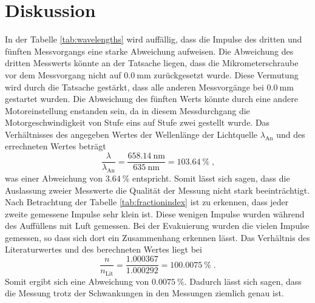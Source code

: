 \section{Diskussion}
\label{sec:Diskussion}
In der Tabelle \ref{tab:wavelengths} wird auffällig, dass die Impulse des dritten und fünften Messvorgangs eine starke Abweichung aufweisen.
Die Abweichung des dritten Messwerts könnte an der Tatsache liegen, dass die Mikrometerschraube vor dem Messvorgang nicht auf $\SI{0.0}{\milli\metre}$
zurückgesetzt wurde. 
Diese Vermutung wird durch die Tatsache gestärkt, dass alle anderen Messvorgänge bei  $\SI{0.0}{\milli\metre}$ gestartet wurden.
Die Abweichung des fünften Werts könnte durch eine andere Motoreinstellung enstanden sein, da in diesem Messdurchgang die Motorgeschwindigkeit von Stufe
eins auf Stufe zwei gestellt wurde.
Das Verhältnisses des angegeben Wertes der Wellenlänge der Lichtquelle $\lambda_\text{An}$ und des errechneten Wertes beträgt
\begin{equation*}
    \frac{\lambda}{\lambda_\text{An}} = \frac{\SI{658.14}{\nano\metre}}{\SI{635}{\nano\metre}} = \SI{103.64}{\percent} \; \text{,}
\end{equation*}
was einer Abweichung von $\SI{3.64}{\percent}$ entspricht. Somit lässt sich sagen, dass die Auslassung zweier Messwerte die Qualität der Messung nicht 
stark beeinträchtigt.
Nach Betrachtung der Tabelle \ref{tab:fractionindex} ist zu erkennen, dass jeder zweite gemessene Impulse sehr klein ist. 
Diese wenigen Impulse wurden während des Auffüllens mit Luft gemessen. 
Bei der Evakuierung wurden die vielen Impulse gemessen, so dass sich dort ein Zusammenhang erkennen lässt.
Das Verhältnis des Literaturwertes\cite{fractionindex} und des berechneten Wertes liegt bei 
\begin{equation*}
    \frac{n}{n_\text{Lit}} = \frac{\num{1.000367}}{\num{1.000292}} = \SI{100.0075}{\percent} \; \text{.}
\end{equation*}
Somit ergibt sich eine Abweichung  von $\SI{0.0075}{\percent}$. 
Dadurch lässt sich sagen, dass die Messung trotz der Schwankungen in den Messungen ziemlich genau ist.